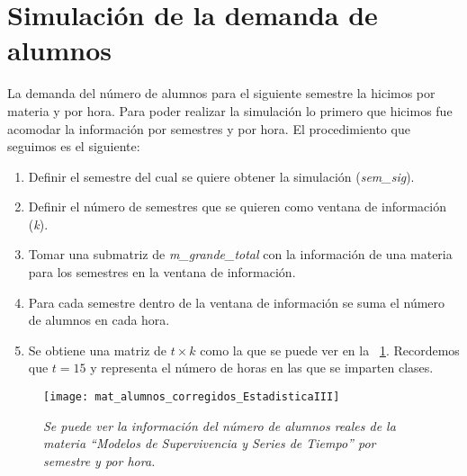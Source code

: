 \section{Simulación de la demanda de alumnos} \label{SimDemandaAlumnos}

La demanda del número de alumnos para el siguiente semestre la hicimos por materia y por hora. Para poder realizar la simulación lo primero que hicimos fue acomodar la información por semestres y por hora. El procedimiento que seguimos es el siguiente:
  
  \begin{enumerate}
\item Definir el semestre del cual se quiere obtener la simulación (\textit{sem\_sig}).

\item Definir el número de semestres que se quieren como ventana de información (\textit{k}).

\item Tomar una submatriz de \textit{m\_grande\_total} con la información de una materia para los semestres en la ventana de información.

\item Para cada semestre dentro de la ventana de información se suma el número de alumnos en cada hora.

\item Se obtiene una matriz de $t \times k$ como la que se puede ver en la \figurename{~\ref{matAl_corregidos}}. Recordemos que $t = 15$ y representa el número de horas en las que se imparten clases.
\end{enumerate}

\begin{figure}[h]
\centering
\texttt{[image: mat\_alumnos\_corregidos\_EstadisticaIII]} %
\caption[\textit{Ejemplo de matriz con alumnos corregidos}]{\textit{Se puede ver la información del número de alumnos reales de la materia ``Modelos de Supervivencia y Series de Tiempo'' por semestre y por hora.}}\label{matAl_corregidos}
\end{figure}


